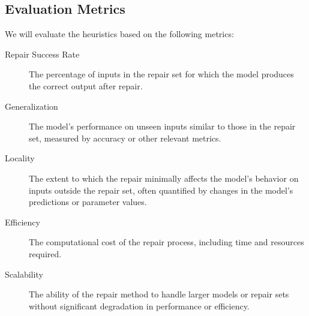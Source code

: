 \documentclass{article}
\begin{document}
\subsection{Evaluation Metrics}
We will evaluate the heuristics based on the following metrics:
\begin{description}
	\item[Repair Success Rate] The percentage of inputs in the repair set for which the model produces the correct output after repair.
	\item[Generalization] The model's performance on unseen inputs similar to those in the repair set, measured by accuracy or other relevant metrics.
	\item[Locality] The extent to which the repair minimally affects the model's behavior on inputs outside the repair set, often quantified by changes in the model's predictions or parameter values.
	\item[Efficiency] The computational cost of the repair process, including time and resources required.
	\item[Scalability] The ability of the repair method to handle larger models or repair sets without significant degradation in performance or efficiency.
\end{description}



\end{document}
